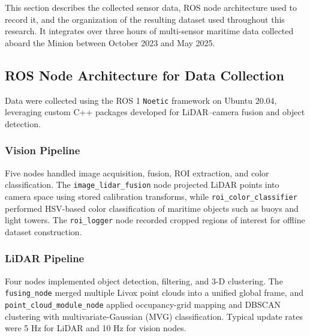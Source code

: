 \documentclass{erauthesis}
\begin{document}
This section describes the collected sensor data, ROS node architecture used to record it, 
and the organization of the resulting dataset used throughout this research.  
It integrates over three hours of multi-sensor maritime data collected aboard the Minion between October 2023 and May 2025.


\subsection{ROS Node Architecture for Data Collection}
\label{sec:ros_architecture}

Data were collected using the ROS 1 \texttt{Noetic} framework on Ubuntu 20.04, 
leveraging custom C++ packages developed for LiDAR–camera fusion and object detection.  

\subsubsection{Vision Pipeline}  
Five nodes handled image acquisition, fusion, ROI extraction, and color classification.  
The \texttt{image\_lidar\_fusion} node projected LiDAR points into camera space using stored calibration transforms,  
while \texttt{roi\_color\_classifier} performed HSV-based color classification of maritime objects such as buoys and light towers.  
The \texttt{roi\_logger} node recorded cropped regions of interest for offline dataset construction.  

\subsubsection{LiDAR Pipeline}  
Four nodes implemented object detection, filtering, and 3-D clustering.  
The \texttt{fusing\_node} merged multiple Livox point clouds into a unified global frame, 
and \texttt{point\_cloud\_module\_node} applied occupancy-grid mapping and DBSCAN clustering with multivariate-Gaussian (MVG) classification.  
Typical update rates were 5 Hz for LiDAR and 10 Hz for vision nodes.  

\end{document}
